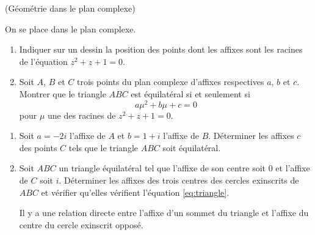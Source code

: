 \documentclass[a4paper,12pt,reqno]{amsart}
\begin{document}
\begin{exo} (Géométrie dans le plan complexe)

  On se place dans le plan complexe.
  \begin{enumerate}
    \item Indiquer sur un dessin la position des points dont les affixes sont les racines de l'équation $z^{2}+z+1=0$.
    \item Soit $A$, $B$ et $C$ trois points du plan complexe d'affixes respectives $a$, $b$ et $c$. Montrer que le triangle $ABC$ est équilatéral si et seulement si
    \begin{equation}\label{eq:triangle}
      a\mu^{2}+b\mu+c=0\tag{$\bigtriangleup$}
    \end{equation}
    pour $\mu$ une des racines de $z^{2}+z+1=0$.
  \end{enumerate}
  \begin{enumerate}[resume]
    \item Soit $a=-2i$ l'affixe de $A$ et $b=1+i$ l'affixe de $B$. Déterminer les affixes $c$ des points $C$ tels que le triangle $ABC$ soit équilatéral.\\[-4mm]
    \item
    \begin{minipage}[t]{.56\linewidth}
      Soit $ABC$ un triangle équilatéral tel que l'affixe de son centre soit $0$ et l'affixe de $C$ soit $i$. Déterminer les affixes des trois centres des cercles exinscrits de $ABC$ et vérifier qu'elles vérifient l'équation \eqref{eq:triangle}.\\
      \begin{indication}
        Il y a une relation directe entre l'affixe d'un sommet du triangle et l'affixe du centre du cercle exinscrit opposé.
      \end{indication}
    \end{minipage}\hfill
    \begin{minipage}[t]{.42\linewidth}~\\[11mm]
      \hspace*{\fill}
      \smash{\scalebox{.7}{}}
    \end{minipage}
  \end{enumerate}

\end{exo}
\end{document}
